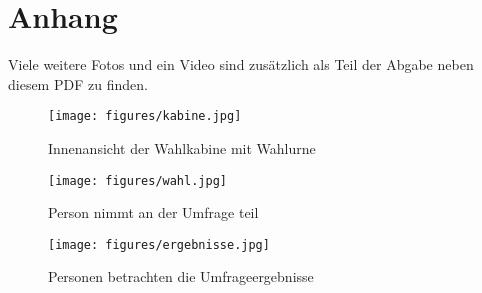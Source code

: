 \section{Anhang}

Viele weitere Fotos und ein Video sind zusätzlich als Teil der Abgabe neben diesem PDF zu finden.

\begin{figure}[ht]
    \centering
    \texttt{[image: figures/kabine.jpg]}
    \caption{Innenansicht der Wahlkabine mit Wahlurne}
    \label{fig:kabine}
\end{figure}

\begin{figure}[ht]
    \centering
    \texttt{[image: figures/wahl.jpg]}
    \caption{Person nimmt an der Umfrage teil}
    \label{fig:wahl}
\end{figure}

\begin{figure}[ht]
    \centering
    \texttt{[image: figures/ergebnisse.jpg]}
    \caption{Personen betrachten die Umfrageergebnisse}
    \label{fig:umfrageergebnisse}
\end{figure}